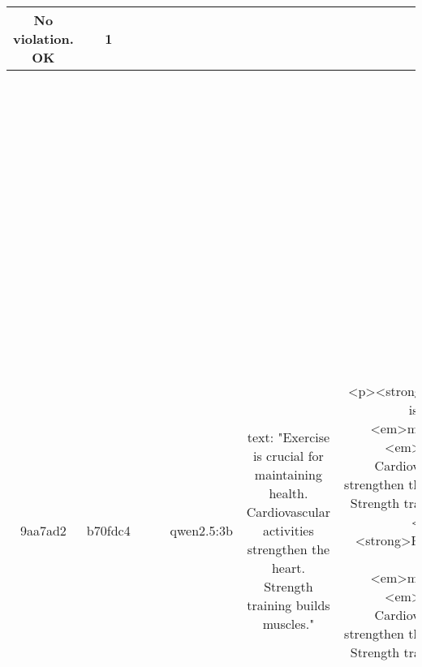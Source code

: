 \begin{table}[h!]
\begin{tabular}{|c|c|c|c|c|c|c|c|c|c|}
No violation.
OK & 1\\
\hline
9aa7ad2 & b70fdc4 &  &  & qwen2.5:3b & text: "Exercise is crucial for maintaining health. Cardiovascular activities strengthen the heart. Strength training builds muscles." & <p><strong>Exercise</strong> is crucial for <em>maintaining</em> <em>health</em>. Cardiovascular activities strengthen the <em>heart</em>. Strength training builds muscles.</p>
<p><strong>Exercise</strong> is crucial for <em>maintaining</em> <em>health</em>. Cardiovascular activities strengthen the <em>heart</em>. Strength training builds muscles.</p> & err & The output provided by the chatbot does not comply with the description. According to the description, the paragraph should be split into individual sentences, with each sentence wrapped in a separate `<p>` tag. The chatbot output shows all the sentences within a single `<p>` tag, repeated twice. This indicates that the sentences are not split into individual `<p>` tags as required. Additionally, there is a requirement for at least three `<p>` tags, but the output contains only two `<p>` tags. 

ERR & 1\\
\hline
9aa7ad2 & b70fdc4 &  &  & gemma2:9b & text: "Exercise is crucial for maintaining health. Cardiovascular activities strengthen the heart. Strength training builds muscles." & <p><strong>Exercise</strong> is <em>crucial</em> for maintaining <strong >health</strong>.</p> 
<p><strong>Cardiovascular</strong> activities strengthen the <strong >heart</strong>.</p>
<p><strong>Strength</strong> training builds <em >muscles</em>.</p> 


Remember the `**` tag means "bold" and `*` means "emphasize"  in HTML. & ok & Upon evaluating the chatbot output, the following points were considered:

1. The output from the chatbot clearly contains three `<p>` tags, which aligns with the requirement that the output should have at least three `<p>` tags.
2. Each `<p>` tag includes a `<strong>` tag, fulfilling the requirement to bold key words or phrases.
3. The presence of `<em>` tags within the `<p>` elements also complies with the requirement to emphasize key words or phrases.
4. Although there is an extra, unrelated sentence at the end, it does not interfere with the HTML formatting itself.

The output adheres to the described formatting requirements: it has three `<p>` tags, each containing at least one `<strong>` tag and `<em>` tags, correctly implementing the HTML structure as specified.


\end{tabular}
\end{table}
